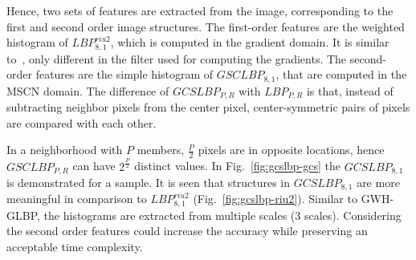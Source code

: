 Hence, two sets of features are extracted from the image, corresponding to the first and second order image structures. The first-order features are the weighted histogram of $LBP_{8, 1}^{riu2}$, which is computed in the gradient domain. It is similar to~\cite{Li2016}, only different in the filter used for computing the gradients. The second-order features are the simple histogram of $GSCLBP_{8, 1}$, that are computed in the MSCN domain. The difference of $GCSLBP_{P, R}$ with $LBP_{P, R}$ is that, instead of subtracting neighbor pixels from the center pixel, center-symmetric pairs of pixels are compared with each other.

\sloppy In a neighborhood with $P$ members, $\frac{P}{2}$ pixels are in opposite locations, hence $GSCLBP_{P,R}$ can have $2^{\frac{P}{2}}$ distinct values. In Fig.~\ref{fig:gcslbp-gcs} the $GCSLBP_{8,1}$ is demonstrated for a sample. It is seen that structures in $GCSLBP_{8,1}$ are more meaningful in comparison to $LBP_{8,1}^{riu2}$ (Fig.~\ref{fig:gcslbp-riu2}). Similar to GWH-GLBP, the histograms are extracted from multiple scales (3 scales). Considering the second order features could increase the accuracy while preserving an acceptable time complexity.

